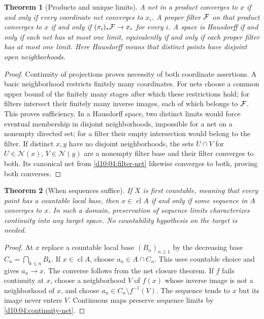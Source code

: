 \documentclass[11pt,oneside,openany]{book}
\newtheorem{theorem}{Theorem}[chapter]
\theoremstyle{definition}
\theoremstyle{remark}
\DeclareMathOperator{\cl}{cl}
\begin{document}
\begin{theorem}[Products and unique limits]\label{d10:04:product-convergence}
A net in a product converges to $x$ if and only if every coordinate net converges to $x_i$. A proper filter $\mathcal F$ on that product converges to $x$ if and only if $(\pi_i)_*\mathcal F\to x_i$ for every $i$. A space is Hausdorff if and only if each net has at most one limit, equivalently if and only if each proper filter has at most one limit. Here Hausdorff means that distinct points have disjoint open neighborhoods.
\end{theorem}
\begin{proof}
Continuity of projections proves necessity of both coordinate assertions. A basic neighborhood restricts finitely many coordinates. For nets choose a common upper bound of the finitely many stages after which these restrictions hold; for filters intersect their finitely many inverse images, each of which belongs to $\mathcal F$. This proves sufficiency. In a Hausdorff space, two distinct limits would force eventual membership in disjoint neighborhoods, impossible for a net on a nonempty directed set; for a filter their empty intersection would belong to the filter. If distinct $x,y$ have no disjoint neighborhoods, the sets $U\cap V$ for $U\in\mathcal N(x)$, $V\in\mathcal N(y)$ are a nonempty filter base and their filter converges to both. Its canonical net from \cref{d10:04:filter-net} likewise converges to both, proving both converses.
\end{proof}

\begin{theorem}[When sequences suffice]\label{d10:04:first-countable-sequences}
If $X$ is first countable, meaning that every point has a countable local base, then $x\in\cl A$ if and only if some sequence in $A$ converges to $x$. In such a domain, preservation of sequence limits characterizes continuity into any target space. No countability hypothesis on the target is needed.
\end{theorem}
\begin{proof}
At $x$ replace a countable local base $(B_n)_{n\ge1}$ by the decreasing base $C_n=\bigcap_{k\le n}B_k$. If $x\in\cl A$, choose $a_n\in A\cap C_n$. This uses countable choice and gives $a_n\to x$. The converse follows from the net closure theorem. If $f$ fails continuity at $x$, choose a neighborhood $V$ of $f(x)$ whose inverse image is not a neighborhood of $x$, and choose $a_n\in C_n\setminus f^{-1}(V)$. The sequence tends to $x$ but its image never enters $V$. Continuous maps preserve sequence limits by \cref{d10:04:continuity-net}.
\end{proof}
\end{document}
